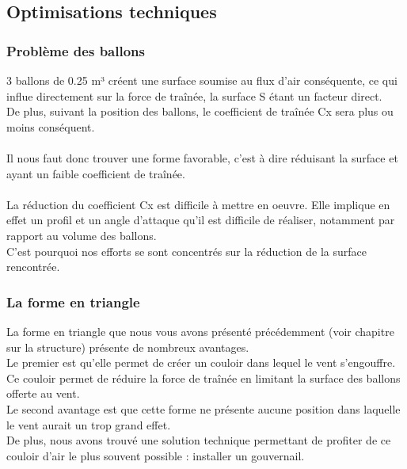 \documentclass[a4paper,11pt]{article}
\begin{document}
\subsection{Optimisations techniques}
\subsubsection{Problème des ballons}
	3 ballons de 0.25 m³ créent une surface soumise au flux d'air conséquente, ce qui influe directement sur la force de traînée, la surface S étant un facteur direct.\\
	De plus, suivant la position des ballons, le coefficient de traînée Cx sera plus ou moins conséquent.\\
	\\
	Il nous faut donc trouver une forme favorable, c'est à dire réduisant la surface et ayant un faible coefficient de traînée.\\
	\\
	La réduction du coefficient Cx est difficile à mettre en oeuvre. Elle implique en effet un profil et un angle d'attaque qu'il est difficile de réaliser, notamment par rapport au volume des ballons.\\
	C'est pourquoi nos efforts se sont concentrés sur la réduction de la surface rencontrée.

\subsubsection{La forme en triangle}
	La forme en triangle que nous vous avons présenté précédemment (voir chapitre sur la structure) présente de nombreux avantages.
	\\
	Le premier est qu'elle permet de créer un couloir dans lequel le vent s'engouffre. Ce couloir permet de réduire la force de traînée en limitant la surface des ballons offerte au vent. \\
	Le second avantage est que cette forme ne présente aucune position dans laquelle le vent aurait un trop grand effet.\\
	De plus, nous avons trouvé une solution technique permettant de profiter de ce couloir d'air le plus souvent possible : installer un gouvernail.
\end{document}
